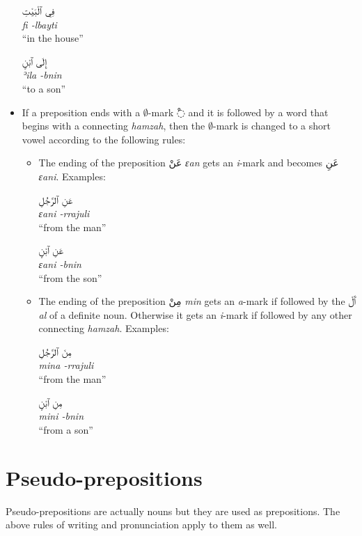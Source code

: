 \documentclass[
  10pt,
]{book}
\begin{document}
\begin{itemize}
  \foreignlanguage{arabic}{فِي ٱلْبَيْتِ}\\
  \emph{fi -lbayti}\\
  \enquote{in the house}

  \foreignlanguage{arabic}{إِلَى ٱبْنٍ}\\
  \emph{ʾila -bnin}\\
  \enquote{to a son}
\item
  If a preposition ends with a \(\emptyset\)-mark \foreignlanguage{arabic}{◌ْ} and it is followed by a word that begins with a connecting \emph{hamzah}, then the \(\emptyset\)-mark is changed to a short vowel according to the following rules:

  \begin{itemize}
  \item
    The ending of the preposition \foreignlanguage{arabic}{عَنْ} \emph{ɛan} gets an \emph{i}-mark and becomes \foreignlanguage{arabic}{عَنِ} \emph{ɛani}. Examples:

    \foreignlanguage{arabic}{عَنِ ٱلرَّجُلِ}\\
    \emph{ɛani -rrajuli}\\
    \enquote{from the man}

    \foreignlanguage{arabic}{عَنِ ٱبْنٍ}\\
    \emph{ɛani -bnin}\\
    \enquote{from the son}
  \item
    The ending of the preposition \foreignlanguage{arabic}{مِنْ} \emph{min} gets an \emph{a}-mark if followed by the \foreignlanguage{arabic}{ٱَلْ} \emph{al} of a definite noun. Otherwise it gets an \emph{i}-mark if followed by any other connecting \emph{hamzah}. Examples:

    \foreignlanguage{arabic}{مِنَ ٱلرَّجُلِ}\\
    \emph{mina -rrajuli}\\
    \enquote{from the man}

    \foreignlanguage{arabic}{مِنِ ٱبْنٍ}\\
    \emph{mini -bnin}\\
    \enquote{from a son}
  \end{itemize}
\end{itemize}

\section{Pseudo-prepositions}\label{pseudo-prepositions}

Pseudo-prepositions are actually nouns but they are used as prepositions. The above rules of writing and pronunciation apply to them as well.
\end{document}
